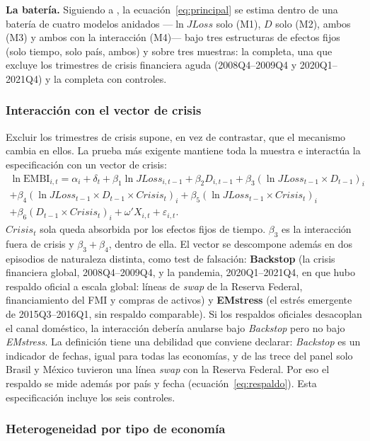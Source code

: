 \textbf{La batería.} Siguiendo a \citet{Chari2024b}, la ecuación~\eqref{eq:principal} se estima dentro de una batería de cuatro modelos anidados ---$\ln JLoss$ solo (M1), $D$ solo (M2), ambos (M3) y ambos con la interacción (M4)--- bajo tres estructuras de efectos fijos (solo tiempo, solo país, ambos) y sobre tres muestras: la completa, una que excluye los trimestres de crisis financiera aguda (2008Q4--2009Q4 y 2020Q1--2021Q4) y la completa con controles.

\subsubsection{Interacción con el vector de crisis}

Excluir los trimestres de crisis supone, en vez de contrastar, que el mecanismo cambia en ellos. La prueba más exigente mantiene toda la muestra e interactúa la especificación con un vector de crisis:
\begin{multline}
\ln\mathrm{EMBI}_{i,t}=\alpha_i+\delta_t+\beta_1\ln JLoss_{i,t-1}+\beta_2D_{i,t-1}+\beta_3(\ln JLoss_{t-1}\times D_{t-1})_i\\
+\beta_4(\ln JLoss_{t-1}\times D_{t-1}\times Crisis_t)_i+\beta_5(\ln JLoss_{t-1}\times Crisis_t)_i\\
+\beta_6(D_{t-1}\times Crisis_t)_i+\omega'X_{i,t}+\varepsilon_{i,t}.
\label{eq:crisisint}
\end{multline}
$Crisis_t$ sola queda absorbida por los efectos fijos de tiempo. $\beta_3$ es la interacción fuera de crisis y $\beta_3+\beta_4$, dentro de ella. El vector se descompone además en dos episodios de naturaleza distinta, como test de falsación: \textbf{Backstop} (la crisis financiera global, 2008Q4--2009Q4, y la pandemia, 2020Q1--2021Q4, en que hubo respaldo oficial a escala global: líneas de \textit{swap} de la Reserva Federal, financiamiento del FMI y compras de activos) y \textbf{EMstress} (el estrés emergente de 2015Q3--2016Q1, sin respaldo comparable). Si los respaldos oficiales desacoplan el canal doméstico, la interacción debería anularse bajo \textit{Backstop} pero no bajo \textit{EMstress}. La definición tiene una debilidad que conviene declarar: \textit{Backstop} es un indicador de fechas, igual para todas las economías, y de las trece del panel solo Brasil y México tuvieron una línea \textit{swap} con la Reserva Federal. Por eso el respaldo se mide además por país y fecha (ecuación~\eqref{eq:respaldo}). Esta especificación incluye los seis controles.

\subsubsection{Heterogeneidad por tipo de economía}

